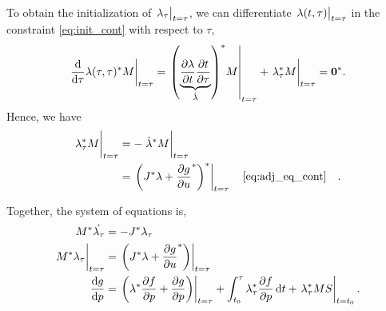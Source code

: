 \documentclass[a4paper,9pt]{article}
\theoremstyle{definition}
\theoremstyle{remark}
\begin{document}
To obtain the initialization of $\eval{\lambda_\tau}_{t=\tau}$, we can
differentiate $\eval{\lambda(t, \tau)}_{t=\tau}$ in the constraint
\cref{eq:init_cont} with respect to $\tau$,
\begin{equation}
  \eval{\dv{\tau}\lambda(\tau, \tau)^* M}_{t=\tau} =
  \eval{\qty(\underbrace{\pdv{\lambda}{t}\pdv{t}{\tau}}_{\dot{\lambda}})^*
  M}_{t=\tau} + \eval{\lambda_\tau^* M}_{t=\tau} = \bm{0}^*.
\end{equation}
Hence, we have
\begin{align}
  \eval{\lambda_\tau^* M}_{t=\tau}
  &= -\eval{\dot{\lambda}^* M}_{t=\tau} \\
  &= \eval{\qty(J^* \lambda + \pdv{g}{u}^*)^*}_{t=\tau} \qq{\cref{eq:adj_eq_cont}}.
\end{align}

Together, the system of equations is,
\begin{align}
    M^*\dot{\lambda_\tau} &= -J^* \lambda_\tau \\
    \eval{M^* \lambda_\tau}_{t=\tau} &= \eval{\qty(J^* \lambda +
    \pdv{g}{u}^*)}_{t=\tau} \\
    \dv{g}{p} &= \eval{\qty(\lambda^* \pdv{f}{p} + \pdv{g}{p})}_{t=\tau} +
                          \int_{t_0}^\tau \lambda_\tau^* \pdv{f}{p} \dd{t} +
                          \eval{\lambda_\tau^* MS}_{t=t_0}.
\end{align}
\end{document}
